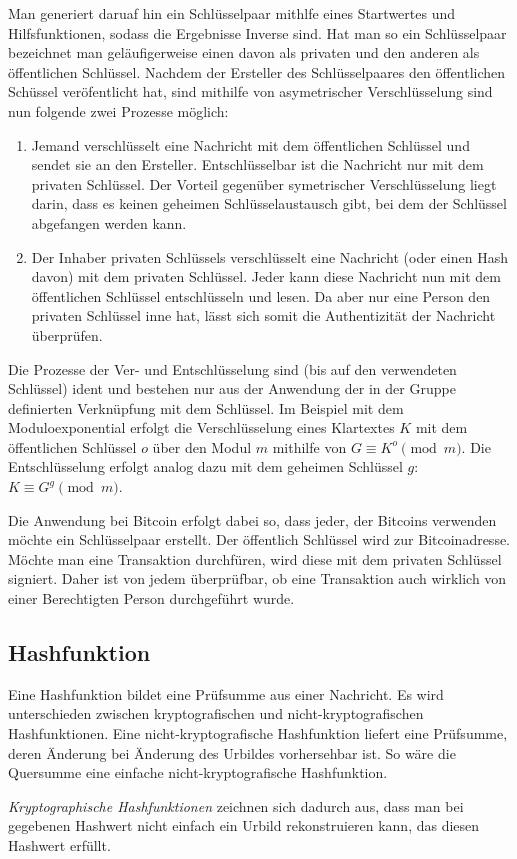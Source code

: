 Man generiert daruaf hin ein Schlüsselpaar mithlfe eines Startwertes und Hilfsfunktionen, sodass die Ergebnisse Inverse sind.
Hat man so ein Schlüsselpaar bezeichnet man geläufigerweise einen davon als privaten und den anderen als öffentlichen Schlüssel.
Nachdem der Ersteller des Schlüsselpaares den öffentlichen Schüssel veröfentlicht hat, sind mithilfe von asymetrischer Verschlüsselung sind nun folgende zwei Prozesse möglich:
\begin{enumerate}
    \item Jemand verschlüsselt eine Nachricht mit dem öffentlichen Schlüssel und sendet sie an den Ersteller.
    Entschlüsselbar ist die Nachricht nur mit dem privaten Schlüssel.
    Der Vorteil gegenüber symetrischer Verschlüsselung liegt darin, dass es keinen geheimen Schlüsselaustausch gibt, bei dem der Schlüssel abgefangen werden kann.
    \item Der Inhaber privaten Schlüssels verschlüsselt eine Nachricht (oder einen Hash davon) mit dem privaten Schlüssel.
    Jeder kann diese Nachricht nun mit dem öffentlichen Schlüssel entschlüsseln und lesen.
    Da aber nur eine Person den privaten Schlüssel inne hat, lässt sich somit die Authentizität der Nachricht überprüfen.
\end{enumerate}

Die Prozesse der Ver- und Entschlüsselung sind (bis auf den verwendeten Schlüssel) ident und bestehen nur aus der Anwendung der in der Gruppe definierten Verknüpfung mit dem Schlüssel.
Im Beispiel mit dem Moduloexponential erfolgt die Verschlüsselung eines Klartextes $K$ mit dem öffentlichen Schlüssel $o$ über den Modul $m$ mithilfe von $G \equiv K^o \pmod{m}$.
Die Entschlüsselung erfolgt analog dazu mit dem geheimen Schlüssel $g$: $K \equiv G^g \pmod{m}$.

Die Anwendung bei Bitcoin erfolgt dabei so, dass jeder, der Bitcoins verwenden möchte ein Schlüsselpaar erstellt.
Der öffentlich Schlüssel wird zur Bitcoinadresse.
Möchte man eine Transaktion durchfüren, wird diese mit dem privaten Schlüssel signiert.
Daher ist von jedem überprüfbar, ob eine Transaktion auch wirklich von einer Berechtigten Person durchgeführt wurde.

\subsection{Hashfunktion}

Eine Hashfunktion bildet eine Prüfsumme aus einer Nachricht. 
Es wird unterschieden zwischen kryptografischen und nicht-kryptografischen Hashfunktionen.
Eine nicht-kryptografische Hashfunktion liefert eine Prüfsumme, deren Änderung bei Änderung des Urbildes vorhersehbar ist.
So wäre die Quersumme eine einfache nicht-kryptografische Hashfunktion.

\emph{Kryptographische Hashfunktionen} zeichnen sich dadurch aus, dass man bei gegebenen Hashwert nicht einfach ein Urbild rekonstruieren kann, das diesen Hashwert erfüllt.
